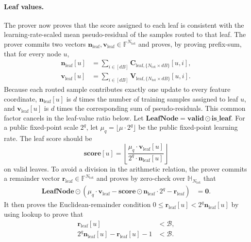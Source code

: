 \paragraph{Leaf values.}
The prover now proves that the score
assigned to each leaf is consistent with the learning-rate-scaled mean
pseudo-residual of the samples routed to that leaf.
The prover
commits two vectors
$\mathbf{n}_{\mathrm{leaf}},\mathbf{v}_{\mathrm{leaf}}
\in\mathbb{F}^{N_{\mathrm{tot}}}$ and proves, by proving prefix-sum, that for every node $u$,
\begin{align}
    \mathbf{n}_{\mathrm{leaf}}[u]
    &=
    \sum_{i\in [dB]}\mathbf{C}_{\mathrm{leaf}, \{N_{\mathrm{tot}}\times dB\}}[u,i],\\
    \mathbf{v}_{\mathrm{leaf}}[u]
    &=
    \sum_{i\in [dB]}\mathbf{V}_{\mathrm{leaf}, \{N_{\mathrm{tot}}\times dB\}}[u,i].
\end{align}
Because each routed sample contributes exactly one update to every feature
coordinate, $\mathbf{n}_{\mathrm{leaf}}[u]$ is $d$ times the number of training
samples assigned to leaf $u$, and $\mathbf{v}_{\mathrm{leaf}}[u]$ is $d$ times
the corresponding sum of pseudo-residuals. This common factor cancels in the
leaf-value ratio below. Let
$\mathbf{LeafNode}=\mathbf{valid}\odot\mathbf{is\_leaf}$.
For a public fixed-point scale $2^q$, let
$\mu_q=\lfloor\mu\cdot 2^q\rfloor$ be the public fixed-point learning rate.
The leaf score should be
\[
    \mathbf{score}[u]
    =
    \left\lfloor
    \frac{\mu_q\cdot\mathbf{v}_{\mathrm{leaf}}[u]}
    {2^q\cdot\mathbf{n}_{\mathrm{leaf}}[u]}
    \right\rfloor
\]
on valid leaves. To avoid a division in the arithmetic relation, the prover
commits a remainder vector
$\mathbf{r}_{\mathrm{leaf}}\in\mathbb{F}^{N_{\mathrm{tot}}}$ and proves by
zero-check over $\mathbb{H}_{N_{\mathrm{tot}}}$ that
\begin{align}
    \mathbf{LeafNode}\odot
    \left(
    \mu_q\cdot\mathbf{v}_{\mathrm{leaf}}
    -\mathbf{score}\odot\mathbf{n}_{\mathrm{leaf}}\cdot 2^q
    -\mathbf{r}_{\mathrm{leaf}}
    \right)
    &=\mathbf{0}.
\end{align}
It then proves the Euclidean-remainder condition
$0\leq\mathbf{r}_{\mathrm{leaf}}[u]<2^q\mathbf{n}_{\mathrm{leaf}}[u]$
by using lookup to prove that
\begin{align}
    \mathbf{r}_{\mathrm{leaf}}[u] &< \mathcal{B},\\
    2^q\mathbf{n}_{\mathrm{leaf}}[u] - \mathbf{r}_{\mathrm{leaf}}[u] - 1 &< \mathcal{B}.
\end{align}

